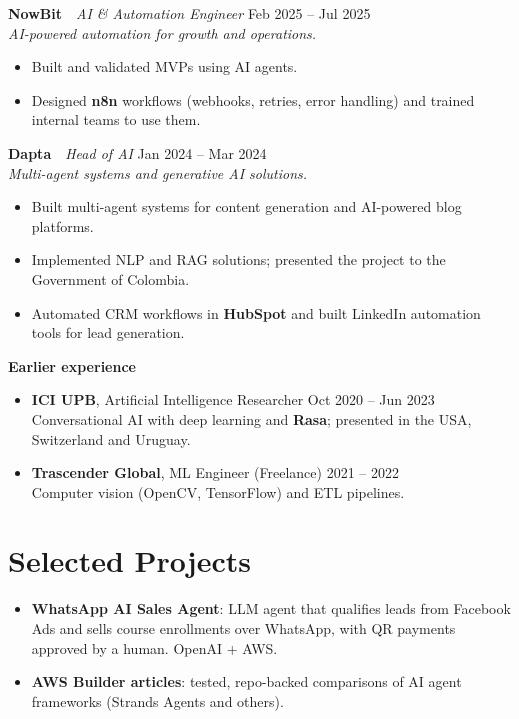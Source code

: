 \documentclass[10pt,letterpaper]{article}
\newcommand{\job}[4]{%
  {\bfseries #1} \,\textbar\, {\itshape #2} \hfill {\small #3}\\
  {\small\itshape #4}\vspace{-5pt}}
\begin{document}
\job{NowBit}{AI \& Automation Engineer}{Feb 2025 -- Jul 2025}{AI-powered automation for growth and operations.}
\begin{itemize}
  \item Built and validated MVPs using AI agents.
  \item Designed \textbf{n8n} workflows (webhooks, retries, error handling) and trained internal teams to use them.
\end{itemize}
\vspace{1pt}

\job{Dapta}{Head of AI}{Jan 2024 -- Mar 2024}{Multi-agent systems and generative AI solutions.}
\begin{itemize}
  \item Built multi-agent systems for content generation and AI-powered blog platforms.
  \item Implemented NLP and RAG solutions; presented the project to the Government of Colombia.
  \item Automated CRM workflows in \textbf{HubSpot} and built LinkedIn automation tools for lead generation.
\end{itemize}
\vspace{1pt}

{\bfseries Earlier experience}\vspace{-5pt}
\begin{itemize}
  \item \textbf{ICI UPB}, Artificial Intelligence Researcher \hfill {\small Oct 2020 -- Jun 2023}\\
        Conversational AI with deep learning and \textbf{Rasa}; presented in the USA, Switzerland and Uruguay.
  \item \textbf{Trascender Global}, ML Engineer (Freelance) \hfill {\small 2021 -- 2022}\\
        Computer vision (OpenCV, TensorFlow) and ETL pipelines.
\end{itemize}

\section*{Selected Projects}
\begin{itemize}
  \item \textbf{WhatsApp AI Sales Agent}: LLM agent that qualifies leads from Facebook Ads and sells course enrollments over WhatsApp, with QR payments approved by a human. OpenAI + AWS.
  \item \textbf{AWS Builder articles}: tested, repo-backed comparisons of AI agent frameworks (Strands Agents and others).
\end{itemize}
\end{document}
